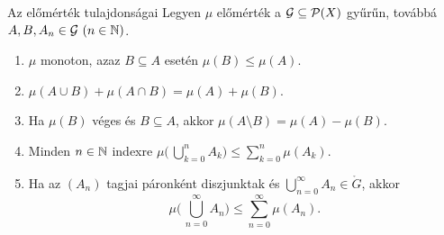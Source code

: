 \documentclass[
]{elteikthesis}[2024/04/26]
\begin{document}
	\newpage
	
	\begin{theorem}{Az előmérték tulajdonságai}{}
		Legyen \( \mu \) előmérték a \( \mathcal{G} \subseteq \mathcal{P}( X ) \) gyűrűn,
		továbbá \( A, B, A_n \in \mathcal{G} \ (n \in \mathbb{N}) \).
		
		\begin{enumerate}
			\item\label{th:előmérték-monoton}
			\( \mu \) monoton, azaz \( B \subseteq A \) esetén \( \mu(B) \leq \mu(A) \).
			
			\item\label{th:előmérték-szita-formula}
			\( \mu(A \cup B) + \mu(A \cap B) = \mu(A) + \mu(B) \).
			
			\item\label{th:előmérték-különbség-mértéke}
			Ha \( \mu(B) \) véges és \( B \subseteq A \),
			akkor \( \mu(A \setminus B) = \mu(A) - \mu(B) \).
			
			\item\label{th:előmérték-véges-szubadditív}
			Minden \( n \in \mathbb{N} \) indexre 
			\( \mu \biggl(\, \bigcup\limits_{k=0}^n \! A_k \biggr) \leq \sum\limits_{k=0}^n \mu( A_k ) \).
			
			\item\label{th:előmérték-szubadditívitás-kiterjesztése}
			Ha az \( (A_n) \) tagjai páronként diszjunktak
			és \( \bigcup\limits_{n=0}^{\infty} \! A_n \in \ring{G} \), akkor
			\[
				\mu \Biggl(\, \bigcup\limits_{n=0}^{\infty} \! A_n \Biggr) \leq 
				\sum\limits_{n=0}^{\infty} \mu( A_n ).
			\]
		\end{enumerate}
	\end{theorem}
\end{document}
